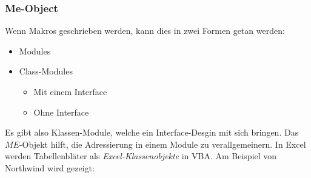 \subsubsection{Me-Object}
Wenn Makros geschrieben werden, kann dies in zwei Formen getan werden:
\begin{itemize}
	\item Modules
	\item Class-Modules
	\begin{itemize}
		\item Mit einem Interface
		\item Ohne Interface
	\end{itemize}
\end{itemize}
Es gibt also Klassen-Module, welche ein Interface-Desgin mit sich bringen.
Das $ME$-Objekt hilft, die Adressierung in einem Module zu verallgemeinern. In Excel werden Tabellenbläter als \textit{Excel-Klassenobjekte} in \gls{VBA}. Am Beispiel von Northwind wird gezeigt:

